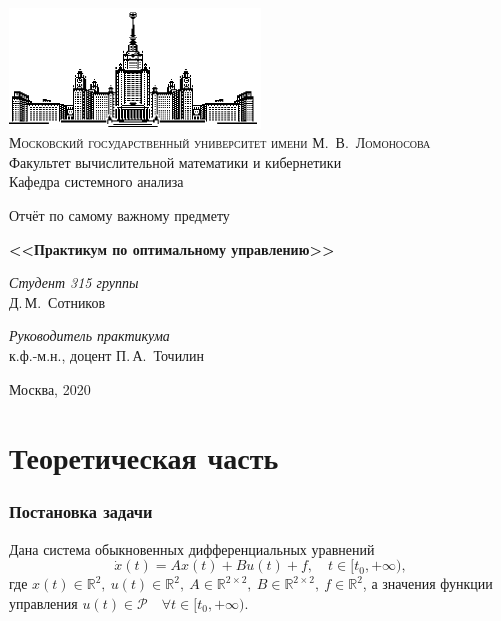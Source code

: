 \documentclass[11pt]{article}
\newcommand\Real{\mathbb{R}}
\newcommand\PS{\mathcal{P}}
\begin{document}
\thispagestyle{empty}

\begin{center}
\ \vspace{-3cm}

\includegraphics[width=0.5\textwidth]{msu.eps}\\
{\scshape Московский государственный университет имени М.~В.~Ломоносова}\\
Факультет вычислительной математики и кибернетики\\
Кафедра системного анализа

\vfill

{\LARGE Отчёт по самому важному предмету}

\vspace{1cm}

{\Huge\bfseries <<Практикум по оптимальному управлению>>}
\end{center}

\vspace{1cm}

\begin{flushright}
  \large
  \textit{Студент 315 группы}\\
  Д.\,М.~Сотников

  \vspace{5mm}

  \textit{Руководитель практикума}\\
  к.ф.-м.н., доцент П.\,А.~Точилин
\end{flushright}

\vfill

\begin{center}
Москва, 2020
\end{center}

\newpage
\part{Теоретическая часть}
\section{Постановка задачи}

Дана система обыкновенных дифференциальных уравнений
\[
\dot{x}\left (t\right ) = A x\left (t\right ) + B u\left (t\right ) + f, \quad t \in [t_0, +\infty),
\]
где $x(t) \in \Real^2, \ u(t) \in \Real^2, \ A \in \Real^{2 \times 2}, \ B \in \Real^{2 \times 2},
 \ f \in \Real^2$, а значения функции управления $u(t) \in \PS \quad \forall t \in [t_0, +\infty)$.
\end{document}
